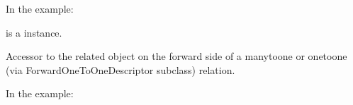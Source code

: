 \documentclass[letterpaper,10pt,french]{sphinxmanual}
\begin{document}
\begin{fulllineitems}
\begin{fulllineitems}
\sphinxAtStartPar
In the example:

\begin{sphinxVerbatim}[commandchars=\\\{\}]
 
       
\end{sphinxVerbatim}

\sphinxAtStartPar
{} is a  instance.

\end{fulllineitems}


\begin{fulllineitems}
\label{\detokenize{main/model:main.models.Paiement.comptable_id}}
\pysigstartsignatures
{}
\pysigstopsignatures
\end{fulllineitems}


\begin{fulllineitems}
\label{\detokenize{main/model:main.models.Paiement.compte_bancaire}}
\pysigstartsignatures
{}
\pysigstopsignatures
\sphinxAtStartPar
Accessor to the related object on the forward side of a many\sphinxhyphen{}to\sphinxhyphen{}one or
one\sphinxhyphen{}to\sphinxhyphen{}one (via ForwardOneToOneDescriptor subclass) relation.

\sphinxAtStartPar
In the example:

\begin{sphinxVerbatim}[commandchars=\\\{\}]
 
       
\end{sphinxVerbatim}


\end{fulllineitems}
\end{fulllineitems}
\end{document}
